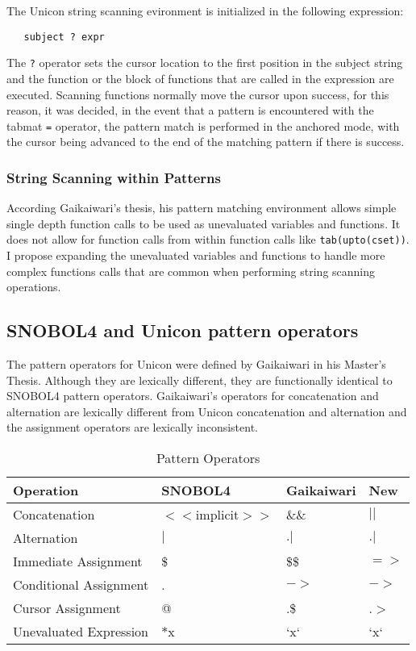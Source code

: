 \documentclass{article}
\begin{document}
The Unicon string scanning evironment is initialized in the following expression:

\begin{verbatim}
   subject ? expr
\end{verbatim}

The \texttt{?} operator sets the cursor location to the first position in the subject string and the function or the block of functions that are called in the expression are executed.  Scanning functions normally move the cursor upon success, for this reason, it was decided, in the event that a pattern is encountered with the tabmat \texttt{=} operator, the pattern match is performed in the anchored mode, with the cursor being advanced to the end of the matching pattern if there is success.

\subsubsection{String Scanning within Patterns}
According Gaikaiwari's thesis, his pattern matching environment allows simple single depth function calls to be used as unevaluated variables and functions.  It does not allow for function calls from within function calls like \texttt{tab(upto(cset))}.\cite{Gaikaiwari2005}  I propose expanding the unevaluated variables and functions to handle more complex functions calls that are common when performing string scanning operations.

\subsection{SNOBOL4 and Unicon pattern operators}
The pattern operators for Unicon were defined by Gaikaiwari in his Master's Thesis.  Although they are lexically different, they are functionally identical to SNOBOL4 pattern operators.  Gaikaiwari's operators for concatenation and alternation are lexically different from Unicon concatenation and alternation and the assignment operators are lexically inconsistent.  

\begin{table}[ht]
	\caption{Pattern Operators}
	\centering
	\begin{tabular}{|l|l|l|l|}
		\hline\hline
		Operation & SNOBOL4 & Gaikaiwari & New\\
		\hline
		Concatenation & $<<$implicit$>>$ & \&\& & $||$ \\
		Alternation & $|$ & $.|$ & $.|$ \\
		\hline
		Immediate Assignment & \$ & \$\$ & $=>$ \\
		Conditional Assignment & . & $->$ & $->$\\
		Cursor Assignment & @ & .\$ & .$>$ \\
		\hline
		Unevaluated Expression & $*$x & `x` & `x` \\
		\hline
	\end{tabular}
\end{table}
\end{document}
